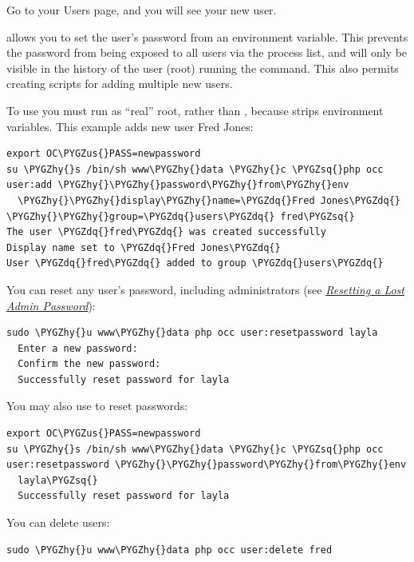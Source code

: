 \documentclass[letterpaper,10pt,english]{sphinxmanual}
\def\PYGZus{\char`\_}
\def\PYGZhy{\char`\-}
\def\PYGZsq{\char`\'}
\def\PYGZdq{\char`\"}
\renewcommand\PYGZsq{\textquotesingle}
\begin{document}
Go to your Users page, and you will see your new user.

 allows you to set the user's password from an environment
variable. This prevents the password from being exposed to all users via the
process list, and will only be visible in the history of the user (root)
running the command. This also permits creating scripts for adding multiple new
users.

To use  you must run as ``real'' root, rather than ,
because  strips environment variables. This example adds new user Fred
Jones:

\begin{Verbatim}[commandchars=\\\{\}]
export OC\PYGZus{}PASS=newpassword
su \PYGZhy{}s /bin/sh www\PYGZhy{}data \PYGZhy{}c \PYGZsq{}php occ user:add \PYGZhy{}\PYGZhy{}password\PYGZhy{}from\PYGZhy{}env
  \PYGZhy{}\PYGZhy{}display\PYGZhy{}name=\PYGZdq{}Fred Jones\PYGZdq{} \PYGZhy{}\PYGZhy{}group=\PYGZdq{}users\PYGZdq{} fred\PYGZsq{}
The user \PYGZdq{}fred\PYGZdq{} was created successfully
Display name set to \PYGZdq{}Fred Jones\PYGZdq{}
User \PYGZdq{}fred\PYGZdq{} added to group \PYGZdq{}users\PYGZdq{}
\end{Verbatim}

You can reset any user's password, including administrators (see
{\hyperref[configuration_user/reset_admin_password::doc]{\emph{\emph{Resetting a Lost Admin Password}}}}):

\begin{Verbatim}[commandchars=\\\{\}]
sudo \PYGZhy{}u www\PYGZhy{}data php occ user:resetpassword layla
  Enter a new password:
  Confirm the new password:
  Successfully reset password for layla
\end{Verbatim}

You may also use  to reset passwords:

\begin{Verbatim}[commandchars=\\\{\}]
export OC\PYGZus{}PASS=newpassword
su \PYGZhy{}s /bin/sh www\PYGZhy{}data \PYGZhy{}c \PYGZsq{}php occ user:resetpassword \PYGZhy{}\PYGZhy{}password\PYGZhy{}from\PYGZhy{}env
  layla\PYGZsq{}
  Successfully reset password for layla
\end{Verbatim}

You can delete users:

\begin{Verbatim}[commandchars=\\\{\}]
sudo \PYGZhy{}u www\PYGZhy{}data php occ user:delete fred
\end{Verbatim}
\end{document}
